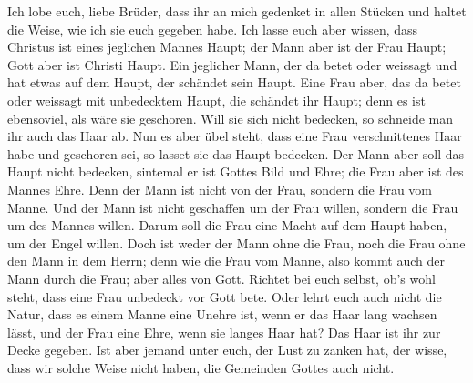  Ich lobe euch, liebe Brüder, dass ihr an mich gedenket in
allen Stücken und haltet die Weise, wie ich sie euch gegeben habe.
 Ich lasse euch aber wissen, dass Christus ist eines
jeglichen Mannes Haupt; der Mann aber ist der Frau Haupt; Gott aber ist
Christi Haupt.  Ein jeglicher Mann, der da betet oder
weissagt und hat etwas auf dem Haupt, der schändet sein Haupt.
 Eine Frau aber, das da betet oder weissagt mit
unbedecktem Haupt, die schändet ihr Haupt; denn es ist ebensoviel, als
wäre sie geschoren.  Will sie sich nicht bedecken, so
schneide man ihr auch das Haar ab. Nun es aber übel steht, dass eine
Frau verschnittenes Haar habe und geschoren sei, so lasset sie das Haupt
bedecken.  Der Mann aber soll das Haupt nicht bedecken,
sintemal er ist Gottes Bild und Ehre; die Frau aber ist des Mannes Ehre.
 Denn der Mann ist nicht von der Frau, sondern die Frau
vom Manne.  Und der Mann ist nicht geschaffen um der Frau
willen, sondern die Frau um des Mannes willen.  Darum
soll die Frau eine Macht auf dem Haupt haben, um der Engel willen.
 Doch ist weder der Mann ohne die Frau, noch die Frau
ohne den Mann in dem Herrn;  denn wie die Frau vom Manne,
also kommt auch der Mann durch die Frau; aber alles von Gott.
 Richtet bei euch selbst, ob's wohl steht, dass eine Frau
unbedeckt vor Gott bete.  Oder lehrt euch auch nicht die
Natur, dass es einem Manne eine Unehre ist, wenn er das Haar lang
wachsen lässt,  und der Frau eine Ehre, wenn sie langes
Haar hat? Das Haar ist ihr zur Decke gegeben.  Ist aber
jemand unter euch, der Lust zu zanken hat, der wisse, dass wir solche
Weise nicht haben, die Gemeinden Gottes auch nicht.

